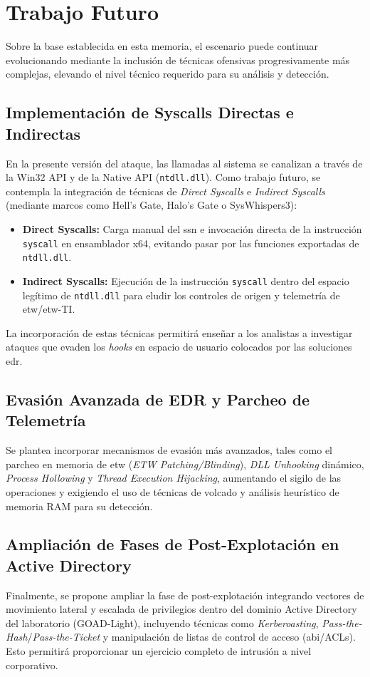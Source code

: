\section{Trabajo Futuro}

Sobre la base establecida en esta memoria, el escenario puede continuar evolucionando mediante la inclusión de técnicas ofensivas progresivamente más complejas, elevando el nivel técnico requerido para su análisis y detección.

\subsection{Implementación de Syscalls Directas e Indirectas}

En la presente versión del ataque, las llamadas al sistema se canalizan a través de la Win32 API y de la Native API (\texttt{ntdll.dll}). Como trabajo futuro, se contempla la integración de técnicas de \textit{Direct Syscalls} e \textit{Indirect Syscalls} (mediante marcos como Hell's Gate, Halo's Gate o SysWhispers3):
\begin{itemize}
    \item \textbf{Direct Syscalls:} Carga manual del \acrshort{ssn} e invocación directa de la instrucción \texttt{syscall} en ensamblador x64, evitando pasar por las funciones exportadas de \texttt{ntdll.dll}.
    \item \textbf{Indirect Syscalls:} Ejecución de la instrucción \texttt{syscall} dentro del espacio legítimo de \texttt{ntdll.dll} para eludir los controles de origen y telemetría de \acrshort{etw}/\acrshort{etw}-TI.
\end{itemize}
La incorporación de estas técnicas permitirá enseñar a los analistas a investigar ataques que evaden los \textit{hooks} en espacio de usuario colocados por las soluciones \acrshort{edr}.

\subsection{Evasión Avanzada de EDR y Parcheo de Telemetría}

Se plantea incorporar mecanismos de evasión más avanzados, tales como el parcheo en memoria de \acrshort{etw} (\textit{ETW Patching/Blinding}), \textit{DLL Unhooking} dinámico, \textit{Process Hollowing} y \textit{Thread Execution Hijacking}, aumentando el sigilo de las operaciones y exigiendo el uso de técnicas de volcado y análisis heurístico de memoria RAM para su detección.

\subsection{Ampliación de Fases de Post-Explotación en Active Directory}

Finalmente, se propone ampliar la fase de post-explotación integrando vectores de movimiento lateral y escalada de privilegios dentro del dominio Active Directory del laboratorio (GOAD-Light), incluyendo técnicas como \textit{Kerberoasting}, \textit{Pass-the-Hash}/\textit{Pass-the-Ticket} y manipulación de listas de control de acceso (\acrshort{abi}/ACLs). Esto permitirá proporcionar un ejercicio completo de intrusión a nivel corporativo.
